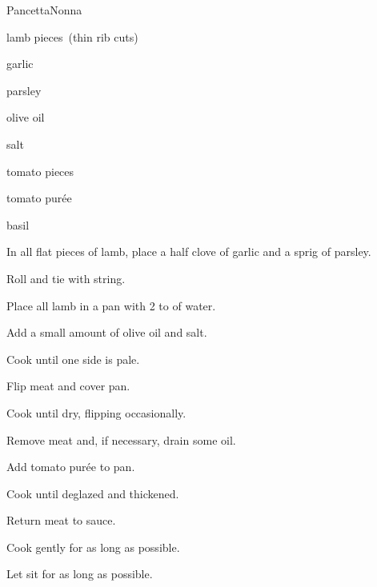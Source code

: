 \begin{recipe}{Pancetta}{Nonna}{}

\begin{ingredients}
\item lamb pieces~(thin rib cuts)
\item garlic
\item parsley
\item olive oil
\item salt
\item tomato pieces
\item tomato pur\'ee
\item basil
\end{ingredients}

\begin{directions}
\item In all flat pieces of lamb, place a half clove of garlic and a sprig of parsley.
\item Roll and tie with string.
\item Place all lamb in a pan with 2 to  of water.
\item Add a small amount of olive oil and salt.
\item Cook until one side is pale.
\item Flip meat and cover pan.
\item Cook until dry, flipping occasionally.
\item Remove meat and, if necessary, drain some oil.
\item Add tomato pur\'ee to pan.
\item Cook until deglazed and thickened.
\item Return meat to sauce.
\item Cook gently for as long as possible.
\item Let sit for as long as possible.
\end{directions}

\end{recipe}
